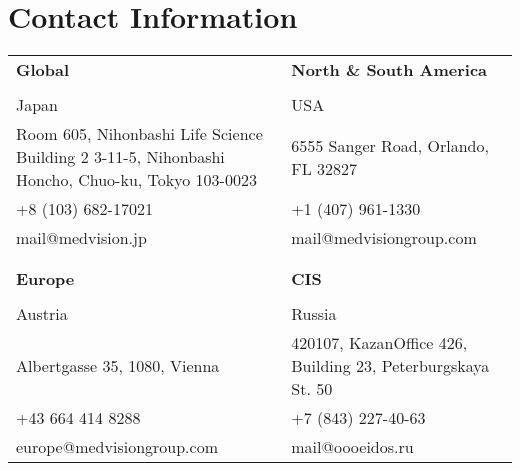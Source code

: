 {
    \section{Contact Information}

    \begin{longtable}{p{5cm} p{5cm}}
        \textbf{Global} & \textbf{North \& South America}\\
        \\
        Japan & USA\\
        Room 605, Nihonbashi Life Science Building 2 3-11-5, Nihonbashi Honcho, Chuo-ku, Tokyo 103-0023 & 6555 Sanger Road, Orlando, FL 32827 \\
        +8 (103) 682-17021 &  +1 (407) 961-1330 \\
        mail@medvision.jp & mail@medvisiongroup.com\\
        \\
        \\
        \textbf{Europe} & \textbf{CIS}\\
        \\
        Austria & Russia\\
        Albertgasse 35, 1080, Vienna & 420107, Kazan\newline Office 426, Building 23, Peterburgskaya St. 50\\
        +43 664 414 8288 &  +7 (843) 227-40-63\\
        europe@medvisiongroup.com & mail@oooeidos.ru\\
    \end{longtable}
    \newpage
}
\fi


    